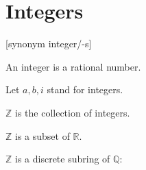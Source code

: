 \documentclass{article}
\begin{document}
\section{Integers}

\begin{forthel}

[synonym integer/-s]

\begin{signature} An integer is a rational number.
\end{signature}
Let $a,b,i$ stand for integers.

\begin{definition} $\mathbb{Z}$ is the collection of integers.
\end{definition}


\begin{theorem} $\mathbb{Z}$ is a subset of $\mathbb{R}$.
\end{theorem}

\end{forthel}

$\mathbb{Z}$ is a discrete subring of $\mathbb{Q}$:
\end{document}
